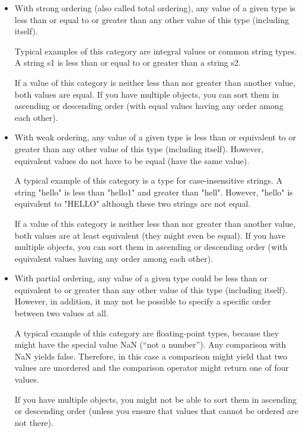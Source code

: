 \begin{itemize}
\item
With strong ordering (also called total ordering), any value of a given type is less than or equal to or greater than any other value of this type (including itself).

Typical examples of this category are integral values or common string types. A string s1 is less than or equal to or greater than a string s2.

If a value of this category is neither less than nor greater than another value, both values are equal. If you have multiple objects, you can sort them in ascending or descending order (with equal values having any order among each other).

\item
With weak ordering, any value of a given type is less than or equivalent to or greater than any other value of this type (including itself). However, equivalent values do not have to be equal (have the same value).

A typical example of this category is a type for case-insensitive strings. A string "hello" is less than "hello1" and greater than "hell". However, "hello" is equivalent to "HELLO" although these two strings are not equal.

If a value of this category is neither less than nor greater than another value, both values are at least equivalent (they might even be equal). If you have multiple objects, you can sort them in ascending or descending order (with equivalent values having any order among each other).

\item
With partial ordering, any value of a given type could be less than or equivalent to or greater than any other value of this type (including itself). However, in addition, it may not be possible to specify a specific order between two values at all.

A typical example of this category are floating-point types, because they might have the special value NaN (“not a number”). Any comparison with NaN yields false. Therefore, in this case a comparison might yield that two values are unordered and the comparison operator might return one of four values.

If you have multiple objects, you might not be able to sort them in ascending or descending order (unless you ensure that values that cannot be ordered are not there).
\end{itemize}

